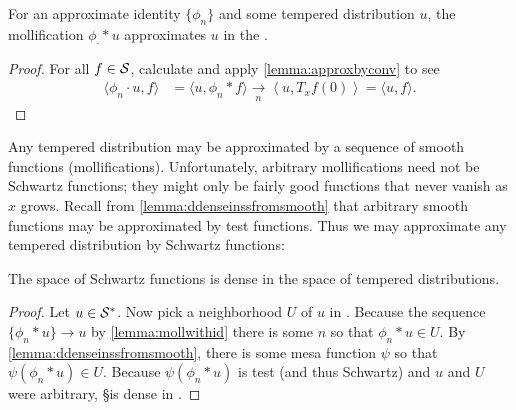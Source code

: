     \begin{lemma}
      \label{lemma:mollwithid}
      For an approximate identity $\{\phi_n\}$ and some tempered distribution $u$, the mollification $\phi_\cdot *u$ approximates $u$ in the \ws.
    \end{lemma}
    \begin{proof}
      For all $f\in\S$, calculate and apply \cref{lemma:approxbyconv} to see
      \begin{align*}
        \langle \phi_n\cdot u, f\rangle
        &= \langle u, \phi_n*f\rangle
        \underset{n}{\longrightarrow} \left\langle u, T_xf(0) \right\rangle
        = \langle u,f\rangle \text{.}
      \end{align*}
    \end{proof}

    Any tempered distribution may be approximated by a sequence of smooth functions (mollifications).
    Unfortunately, arbitrary mollifications need not be Schwartz functions; they might only be fairly good functions that never vanish as $x$ grows.
    Recall from \cref{lemma:ddenseinssfromsmooth} that arbitrary smooth functions may be approximated by test functions.
    Thus we may approximate any tempered distribution by Schwartz functions:

    \begin{thm}
      \label{thm:sdenseinss}
      The space of Schwartz functions is dense in the space of tempered distributions.
    \end{thm}
    \begin{proof}
      Let $u\in\SS$.
      Now pick a neighborhood $U$ of $u$ in \SS.
      Because the sequence $\{\phi_n*u\}\rightarrow u$ by \cref{lemma:mollwithid} there is some $n$ so that $\phi_n*u\in U$.
      By \cref{lemma:ddenseinssfromsmooth}, there is some mesa function $\psi$ so that $\psi(\phi_n*u)\in U$.
      Because $\psi(\phi_n*u)$ is test (and thus Schwartz) and $u$ and $U$ were arbitrary, \S is dense in \SS.
    \end{proof}



